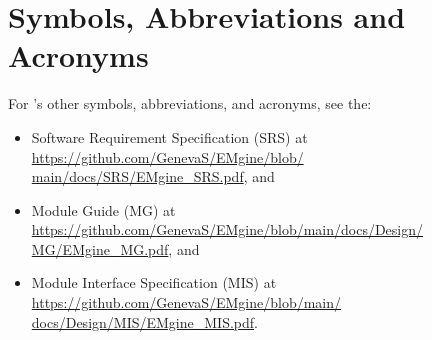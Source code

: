 \section{Symbols, Abbreviations and Acronyms}\label{sec:refs}
For \progname{}'s other symbols, abbreviations, and acronyms, see the:
\begin{itemize}
    \item Software Requirement Specification (SRS) at
    \href{https://github.com/GenevaS/EMgine/blob/main/docs/SRS/EMgine_SRS.pdf}{https://github.com/GenevaS/EMgine/blob/
        \newline main/docs/SRS/EMgine\_SRS.pdf}, and
    \item Module Guide (MG) at
    \href{https://github.com/GenevaS/EMgine/blob/main/docs/Design/MG/EMgine_MG.pdf}{https://github.com/GenevaS/EMgine/blob/main/docs/Design/\newline
        MG/EMgine\_MG.pdf}, and
    \item Module Interface Specification (MIS) at
    \href{https://github.com/GenevaS/EMgine/blob/main/docs/Design/MIS/EMgine_MIS.pdf}{https://github.com/GenevaS/EMgine/blob/main/
        \newline docs/Design/MIS/EMgine\_MIS.pdf}.
\end{itemize}

